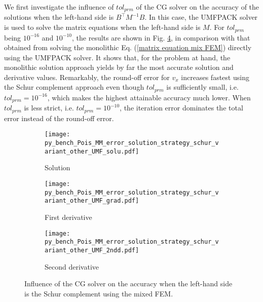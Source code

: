\documentclass[review,3p]{elsarticle}
\begin{document}
We first investigate the influence of $tol_{prm}$ of the CG solver on the accuracy of the solutions when the left-hand side is $B^{\top}M^{-1}B$. In this case, the UMFPACK solver is used to solve the matrix equations when the left-hand side is $M$.  
For $tol_{prm}$ being $10^{-16}$ and $10^{-10}$, the results are shown in Fig. \ref{Fig:py_bench_Pois_MM_error_solution_strategy_schur_variant_other_UMF}, in comparison with that obtained from solving the monolithic Eq. (\ref{matrix equation mix FEM}) directly using the UMFPACK solver.
It shows that, for the problem at hand, the monolithic solution approach yields by far the most accurate solution and derivative values.
Remarkably, the round-off error for $v_{x}$ increases fastest using the Schur complement approach even though $tol_{prm}$ is sufficiently small, i.e. $tol_{prm}=10^{-16}$, which makes the highest attainable accuracy much lower.
When $tol_{prm}$ is less strict, i.e. $tol_{prm}=10^{-10}$, the iteration error dominates the total error instead of the round-off error.

\begin{figure}[!ht]
    \begin{subfigure}{5.5cm}
        \texttt{[image: py\_bench\_Pois\_MM\_error\_solution\_strategy\_schur\_variant\_other\_UMF\_solu.pdf]}
        \caption{Solution}
        \label{Fig:py_bench_Pois_MM_error_solution_strategy_schur_variant_other_UMF_solu}
    \end{subfigure}
    \hspace{-0.2cm}
    \begin{subfigure}{5.5cm}
        \texttt{[image: py\_bench\_Pois\_MM\_error\_solution\_strategy\_schur\_variant\_other\_UMF\_grad.pdf]}
        \caption{First derivative}
        \label{Fig:py_bench_Pois_MM_error_solution_strategy_schur_variant_other_UMF_grad}
    \end{subfigure}
    \hspace{-0.2cm}
    \begin{subfigure}{5.5cm}
        \texttt{[image: py\_bench\_Pois\_MM\_error\_solution\_strategy\_schur\_variant\_other\_UMF\_2ndd.pdf]}
        \caption{Second derivative}
        \label{Fig:py_bench_Pois_MM_error_solution_strategy_schur_variant_other_UMF_2ndd}
    \end{subfigure}
\caption{Influence of the CG solver on the accuracy when the left-hand side is the Schur complement using the mixed FEM.}
\label{Fig:py_bench_Pois_MM_error_solution_strategy_schur_variant_other_UMF}
\end{figure}
\end{document}
